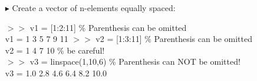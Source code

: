 \documentclass[xcolor={dvipsnames,rgb}, aspectratio=169]{beamer}
\begin{document}
\begin{frame}{}
\begin{itemize}
   \item[$\blacktriangleright$] Create a vector of n-elements equally spaced:
      \begin{tcolorbox}[colback=white,colframe=bluepoli]
         $>>$ v1 = [1:2:11] \color{codegreen}\% Parenthesis can be omitted\\
         \color{black}
         v1 = \hspace{3em} 1 \hspace{3em} 3 \hspace{3em} 5 \hspace{3em} 7 \hspace{3em} 9 \hspace{3em} 11
         \tcblower
         $>>$ v2 = [1:3:11] \color{codegreen}\% Parenthesis can be omitted\\
         \color{black}
         v2 = \hspace{3em} 1 \hspace{3em} 4 \hspace{3em} 7 \hspace{3em} 10
         \color{codegreen} \% be careful! \DrawLine \\
         \color{black}
         $>>$ v3 = linspace(1,10,6) \color{codegreen} \% Parenthesis can NOT be omitted!\\
         \color{black}
         v3 = \hspace{3em} 1.0 \hspace{3em} 2.8 \hspace{3em} 4.6 \hspace{3em} 6.4 \hspace{3em} 8.2 \hspace{3em} 10.0
      \end{tcolorbox}
\end{itemize}
\end{frame}
\end{document}
